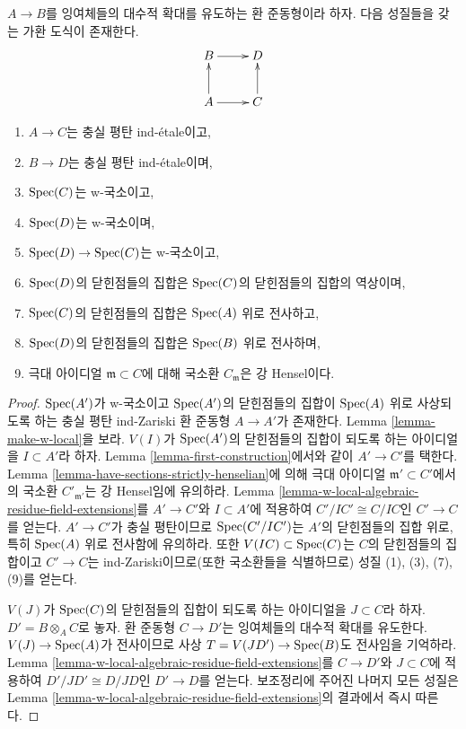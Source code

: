 \begin{lemma}
\label{lemma-get-w-local-algebraic-residue-field-extensions}
$A \to B$를 잉여체들의 대수적 확대를 유도하는 환 준동형이라 하자.
다음 성질들을 갖는 가환 도식이 존재한다.
$$
\xymatrix{
B \ar[r] & D \\
A \ar[r] \ar[u] & C \ar[u]
}
$$
\begin{enumerate}
\item $A \to C$는 충실 평탄 ind-\'etale이고,
\item $B \to D$는 충실 평탄 ind-\'etale이며,
\item $\mathop{\mathrm{Spec}}(C)$는 w-국소이고,
\item $\mathop{\mathrm{Spec}}(D)$는 w-국소이며,
\item $\mathop{\mathrm{Spec}}(D) \to \mathop{\mathrm{Spec}}(C)$는 w-국소이고,
\item $\mathop{\mathrm{Spec}}(D)$의 닫힌점들의 집합은 $\mathop{\mathrm{Spec}}(C)$의 닫힌점들의
집합의 역상이며,
\item $\mathop{\mathrm{Spec}}(C)$의 닫힌점들의 집합은 $\mathop{\mathrm{Spec}}(A)$ 위로 전사하고,
\item $\mathop{\mathrm{Spec}}(D)$의 닫힌점들의 집합은 $\mathop{\mathrm{Spec}}(B)$ 위로 전사하며,
\item 극대 아이디얼 $\mathfrak m \subset C$에 대해 국소환
$C_\mathfrak m$은 강 Hensel이다.
\end{enumerate}
\end{lemma}

\begin{proof}
$\mathop{\mathrm{Spec}}(A')$가 w-국소이고 $\mathop{\mathrm{Spec}}(A')$의 닫힌점들의 집합이
$\mathop{\mathrm{Spec}}(A)$ 위로
사상되도록 하는 충실 평탄 ind-Zariski 환 준동형 $A \to A'$가 존재한다.
Lemma \ref{lemma-make-w-local}을 보라. $V(I)$가 $\mathop{\mathrm{Spec}}(A')$의
닫힌점들의 집합이 되도록 하는 아이디얼을 $I \subset A'$라 하자.
Lemma \ref{lemma-first-construction}에서와 같이 $A' \to C'$를 택한다.
Lemma \ref{lemma-have-sections-strictly-henselian}에 의해 극대 아이디얼
$\mathfrak m' \subset C'$에서의 국소환 $C'_{\mathfrak m'}$는
강 Hensel임에 유의하라. Lemma
\ref{lemma-w-local-algebraic-residue-field-extensions}를
$A' \to C'$와 $I \subset A'$에 적용하여
$C'/IC' \cong C/IC$인 $C' \to C$를 얻는다.
$A' \to C'$가 충실 평탄이므로 $\mathop{\mathrm{Spec}}(C'/IC')$는 $A'$의
닫힌점들의 집합 위로, 특히 $\mathop{\mathrm{Spec}}(A)$ 위로 전사함에 유의하라.
또한 $V(IC) \subset \mathop{\mathrm{Spec}}(C)$는 $C$의 닫힌점들의 집합이고
$C' \to C$는 ind-Zariski이므로(또한 국소환들을 식별하므로)
성질 (1), (3), (7), (9)를 얻는다.

\medskip\noindent
$V(J)$가 $\mathop{\mathrm{Spec}}(C)$의 닫힌점들의 집합이 되도록 하는 아이디얼을
$J \subset C$라 하자. $D' = B \otimes_A C$로 놓자.
환 준동형 $C \to D'$는 잉여체들의 대수적 확대를 유도한다.
$V(J) \to \mathop{\mathrm{Spec}}(A)$가 전사이므로 사상
$T = V(JD') \to \mathop{\mathrm{Spec}}(B)$도 전사임을 기억하라.
Lemma \ref{lemma-w-local-algebraic-residue-field-extensions}를
$C \to D'$와 $J \subset C$에 적용하여
$D'/JD' \cong D/JD$인 $D' \to D$를 얻는다.
보조정리에 주어진 나머지 모든 성질은 Lemma
\ref{lemma-w-local-algebraic-residue-field-extensions}의 결과에서
즉시 따른다.
\end{proof}





